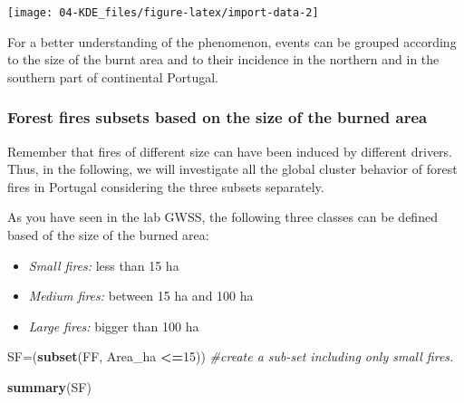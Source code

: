 \documentclass[
]{article}
\newenvironment{Shaded}{\begin{snugshade}}{\end{snugshade}}
\newcommand{\CommentTok}[1]{\textcolor[rgb]{0.56,0.35,0.01}{\textit{#1}}}
\newcommand{\DecValTok}[1]{\textcolor[rgb]{0.00,0.00,0.81}{#1}}
\newcommand{\FunctionTok}[1]{\textcolor[rgb]{0.13,0.29,0.53}{\textbf{#1}}}
\newcommand{\NormalTok}[1]{#1}
\newcommand{\OtherTok}[1]{\textcolor[rgb]{0.56,0.35,0.01}{#1}}
\newcommand{\SpecialCharTok}[1]{\textcolor[rgb]{0.81,0.36,0.00}{\textbf{#1}}}
\providecommand{\tightlist}{%
  \setlength{\itemsep}{0pt}\setlength{\parskip}{0pt}}
\begin{document}
\begin{Shaded}
\end{Shaded}

\begin{center}\texttt{[image: 04-KDE\_files/figure-latex/import-data-2]} \end{center}

For a better understanding of the phenomenon, events can be grouped according to the size of the burnt area and to their incidence in the northern and in the southern part of continental Portugal.

\subsubsection{Forest fires subsets based on the size of the burned area}\label{forest-fires-subsets-based-on-the-size-of-the-burned-area}

Remember that fires of different size can have been induced by different drivers.
Thus, in the following, we will investigate all the global cluster behavior of forest fires in Portugal considering the three subsets separately.

As you have seen in the lab GWSS, the following three classes can be defined based of the size of the burned area:

\begin{itemize}
\tightlist
\item
  \emph{Small fires:} less than 15 ha
\item
  \emph{Medium fires:} between 15 ha and 100 ha
\item
  \emph{Large fires:} bigger than 100 ha
\end{itemize}

\begin{Shaded}
\begin{Highlighting}[]
\NormalTok{SF}\OtherTok{=}\NormalTok{(}\FunctionTok{subset}\NormalTok{(FF, Area\_ha }\SpecialCharTok{\textless{}=}\DecValTok{15}\NormalTok{)) }\CommentTok{\#create a sub{-}set including only small fires. }

\FunctionTok{summary}\NormalTok{(SF)}
\end{Highlighting}
\end{Shaded}
\end{document}
